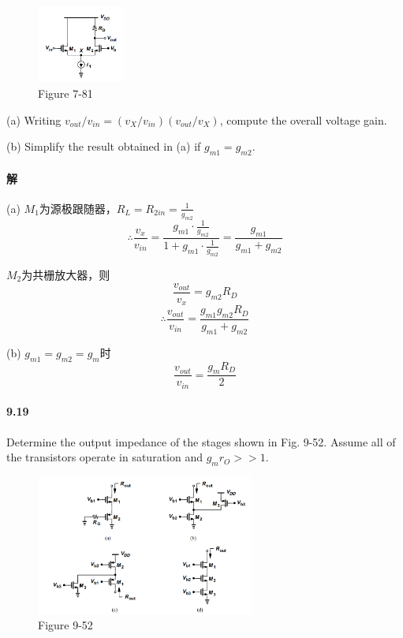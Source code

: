 \documentclass[hyperref, UTF8]{ctexart}
\newcommand{\under}[1]{\frac{1}{#1}}
\newcommand{\underpone}[1]{\frac{#1}{1+#1}}
\begin{document}
    \begin{figure}[!htb]
        \centering
        \includegraphics[width=0.258\textwidth]{p7-81.png}
        \caption*{Figure 7-81}
    \end{figure}    
        
    (a) Writing $v_{out}/v_{in} = (v_X / v_{in})(v_{out}/v_X)$, compute the overall voltage gain.

    (b) Simplify the result obtained in (a) if $g_{m1}=g_{m2}$. 

\paragraph{解}

    (a) $M_1$为源极跟随器，$R_L = R_{2in} = \under{g_{m2}}$
    $$\therefore \frac{v_x}{v_{in}}=\underpone{g_{m1}\cdot\under{g_{m2}}}=\frac{g_{m1}}{g_{m1}+g_{m2}}$$
    
    $M_2$为共栅放大器，则
    $$\frac{v_{out}}{v_x}=g_{m2}R_D$$
    $$\therefore \frac{v_{out}}{v_{in}}=\frac{g_{m1}g_{m2}R_D}{g_{m1}+g_{m2}}$$

    (b) $g_{m1}=g_{m2}=g_{m}$时
    $$\frac{v_{out}}{v_{in}}=\frac{g_mR_D}{2}$$
        
\paragraph{9.19} \label{9.19}
    Determine the output impedance of the stages shown in Fig. 9-52. Assume all of the transistors operate in saturation and $g_mr_O >> 1$. 

    \begin{figure}[!htb]
        \centering
        \includegraphics[width=0.640\textwidth]{p9-52.png}
        \caption*{Figure 9-52}
    \end{figure}
\end{document}
